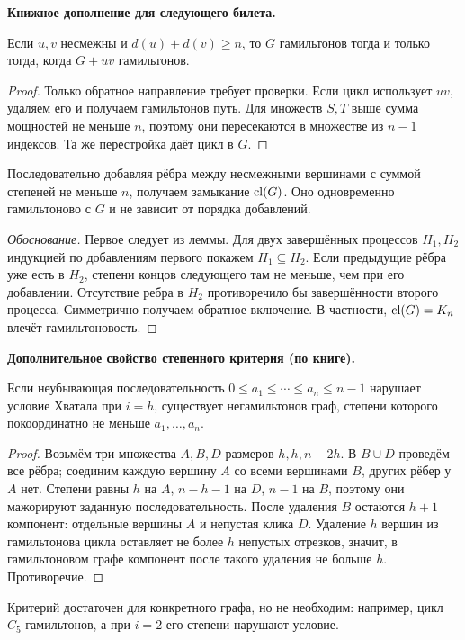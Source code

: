 \textbf{Книжное дополнение для следующего билета.}
\begin{lemma}\label{lem:closure}
Если \(u,v\) несмежны и \(d(u)+d(v)\ge n\), то \(G\) гамильтонов
тогда и только тогда, когда \(G+uv\) гамильтонов.
\end{lemma}
\begin{proof}
Только обратное направление требует проверки. Если цикл использует
\(uv\), удаляем его и получаем гамильтонов путь. Для множеств \(S,T\)
выше сумма мощностей не меньше \(n\), поэтому они пересекаются в
множестве из \(n-1\) индексов. Та же перестройка даёт цикл в \(G\).
\end{proof}
\begin{definition}
Последовательно добавляя рёбра между несмежными вершинами с суммой
степеней не меньше \(n\), получаем замыкание \(\operatorname{cl}(G)\).
Оно одновременно гамильтоново с \(G\) и не зависит от порядка добавлений.
\end{definition}
\begin{proof}[Обоснование]
Первое следует из леммы. Для двух завершённых процессов \(H_1,H_2\)
индукцией по добавлениям первого покажем \(H_1\subseteq H_2\).
Если предыдущие рёбра уже есть в \(H_2\), степени концов следующего
там не меньше, чем при его добавлении. Отсутствие ребра в \(H_2\)
противоречило бы завершённости второго процесса. Симметрично получаем
обратное включение. В частности, \(\operatorname{cl}(G)=K_n\) влечёт гамильтоновость.
\end{proof}
\textbf{Дополнительное свойство степенного критерия (по книге).}
\begin{cor}
Если неубывающая последовательность \(0\le a_1\le\cdots\le a_n\le n-1\)
нарушает условие Хватала при \(i=h\), существует негамильтонов граф,
степени которого покоординатно не меньше \(a_1,\ldots,a_n\).
\end{cor}
\begin{proof}
Возьмём три множества \(A,B,D\) размеров \(h,h,n-2h\).
В \(B\cup D\) проведём все рёбра; соединим каждую вершину \(A\)
со всеми вершинами \(B\), других рёбер у \(A\) нет.
Степени равны \(h\) на \(A\), \(n-h-1\) на \(D\), \(n-1\) на \(B\),
поэтому они мажорируют заданную последовательность.
После удаления \(B\) остаются \(h+1\) компонент: отдельные вершины \(A\)
и непустая клика \(D\). Удаление \(h\) вершин из гамильтонова цикла
оставляет не более \(h\) непустых отрезков, значит, в гамильтоновом графе
компонент после такого удаления не больше \(h\). Противоречие.
\end{proof}


Критерий достаточен для конкретного графа, но не необходим: например,
цикл \(C_5\) гамильтонов, а при \(i=2\) его степени нарушают условие.
